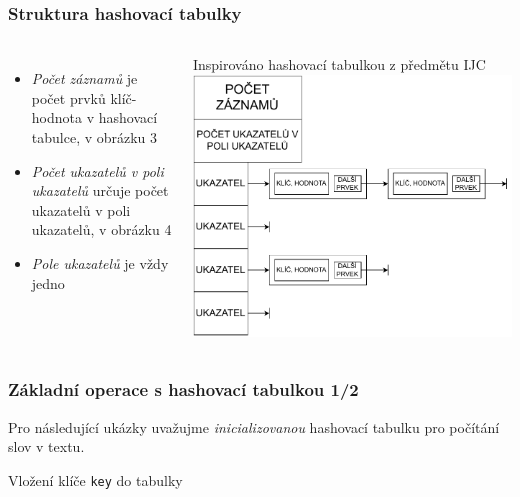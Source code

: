 \documentclass[]{fitthesispresn}
\begin{document}
    \begin{frame}
        \frametitle{Struktura hashovací tabulky}
        \begin{columns}
            \begin{itemize}
                \item \emph{Počet záznamů} je počet prvků klíč-hodnota v hashovací tabulce, v obrázku 3
                \item \emph{Počet ukazatelů v poli ukazatelů} určuje počet ukazatelů v poli ukazatelů, v obrázku 4
                \item \emph{Pole ukazatelů} je vždy jedno
            \end{itemize}
            Inspirováno hashovací tabulkou z předmětu IJC
            \includegraphics[width=\textwidth]{img/hash_table_ijc.pdf}
        \end{columns}
    \end{frame}

    \begin{frame}
        \frametitle{Základní operace s hashovací tabulkou 1/2}
            Pro následující ukázky uvažujme \emph{inicializovanou} hashovací tabulku pro počítání slov v textu.

            \begin{algorithm}[H]
                \caption{Vložení klíče \texttt{key} do tabulky} \label{alg:insert}
                \BlankLine
                \SetAlgoLined
            \end{algorithm}
    \end{frame}
\end{document}
